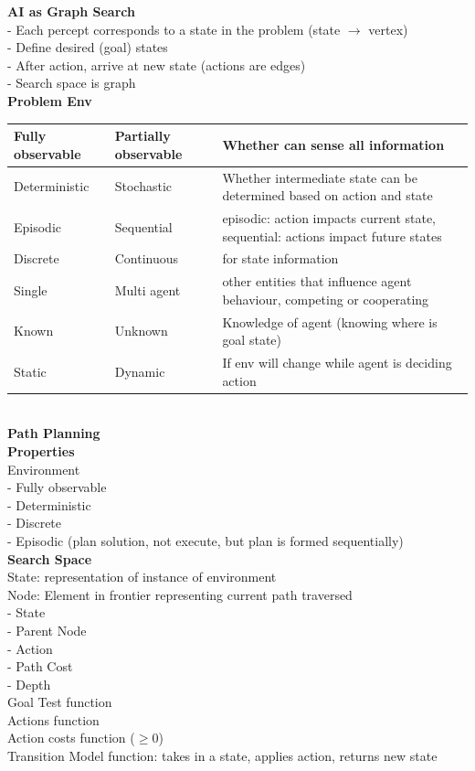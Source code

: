\documentclass[10pt, a4paper]{article}
\newcommand{\header}[1]{{\normalsize\textbf{#1}}}
\newcommand{\tab}[0]{\hspace*{2mm}}
\begin{document}
\begin{multicols*}{3}
	  \textbf{AI as Graph Search}\\
	  - Each percept corresponds to a state in the problem (state $\rightarrow$ vertex)\\
	  - Define desired (goal) states\\
	  - After action, arrive at new state (actions are edges)\\
	  - Search space is graph\\

	  \textbf{Problem Env}\\

	  \begin{tabular}{ | m{1.5cm} | m{1.5cm} | m{5cm} | }
		\hline
		Fully observable & Partially observable & Whether can sense all information\\
		\hline
		Deterministic & Stochastic & Whether intermediate state can be determined based on action and state\\
		\hline
		Episodic & Sequential & episodic: action impacts current state, sequential: actions impact future states\\
		\hline
		Discrete & Continuous & for state information\\
		\hline
		Single & Multi agent & other entities that influence agent behaviour, competing or cooperating\\
		\hline
		Known & Unknown & Knowledge of agent (knowing where is goal state)\\
		\hline
		Static & Dynamic & If env will change while agent is deciding action\\
		\hline
	  \end{tabular}\\

	  \header{Path Planning}\\
	  \textbf{Properties}\\
	  Environment\\
	  \tab - Fully observable\\
	  \tab - Deterministic\\
	  \tab - Discrete\\
	  \tab - Episodic (plan solution, not execute, but plan is formed sequentially)\\

	  \textbf{Search Space}\\
	  State: representation of instance of environment\\
	  Node: Element in frontier representing current path traversed\\
	  \tab - State\\
	  \tab - Parent Node\\
	  \tab - Action\\
	  \tab - Path Cost\\
	  \tab - Depth\\
	  Goal Test function\\
	  Actions function\\
	  Action costs function ($\geq 0$)\\
	  Transition Model function: takes in a state, applies action, returns new state\\


\end{multicols*}
\end{document}

